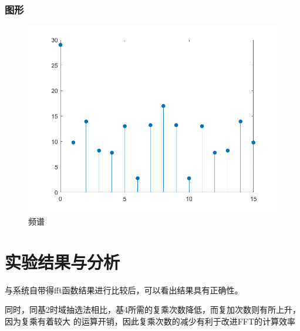\documentclass{../source/zjureport}
\begin{document}
            \subsubsection{图形}
            \begin{figure}[H]
                \centering
                \includegraphics[scale = 0.5]{figure/频谱.png}
                \caption{频谱}
            \end{figure}
    \section{实验结果与分析}
        与系统自带得fft函数结果进行比较后，可以看出结果具有正确性。

        同时，同基2时域抽选法相比，基4所需的复乘次数降低，而复加次数则有所上升，因为复乘有着较大
        的运算开销，因此复乘次数的减少有利于改进FFT的计算效率
\end{document}
